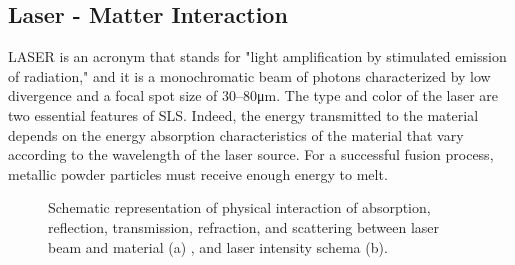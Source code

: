 \subsection{Laser - Matter Interaction}
\label{subsec:sintering}
LASER is an acronym that stands for "light amplification by stimulated emission of radiation," and it is a monochromatic beam of photons characterized by low divergence and a focal spot size of \numrange[range-phrase = --]{30}{80}\unit{\micro\metre}. The type and color of the laser are two essential features of SLS. Indeed, the energy transmitted to the material depends on the energy absorption characteristics of the material that vary according to the wavelength of the laser source. For a successful fusion process, metallic powder particles must receive enough energy to melt.
\begin{figure}
    \centering
    \qquad
    
    \caption[Laser interactions and laser intensity.]{Schematic representation of physical interaction of absorption, reflection, transmission, refraction, and scattering between laser beam and material (a) \cite{katayama_fundamentals_2020}, and laser intensity schema (b).}
\end{figure}
